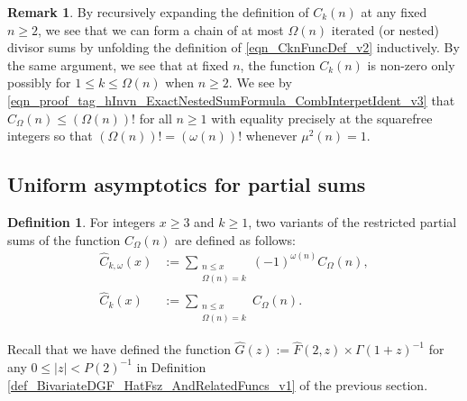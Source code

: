 \documentclass[11pt,reqno,a4letter]{article}
\newcommand{\hlocalref}[1]{\hyperref[#1]{\ref{#1}}}
\numberwithin{equation}{section}
\numberwithin{figure}{section}
\numberwithin{table}{section}
\theoremstyle{plain}
\numberwithin{theorem}{section}
\theoremstyle{definition}
\newtheorem{remark}[theorem]{Remark}
\newtheorem{definition}[theorem]{Definition}
\begin{document}
\begin{remark}
By recursively expanding the definition of $C_k(n)$ 
at any fixed $n \geq 2$, we see that 
we can form a chain of at most $\Omega(n)$ iterated (or nested) divisor sums by 
unfolding the definition of \eqref{eqn_CknFuncDef_v2} inductively. 
By the same argument, we see that at fixed $n$, the function 
$C_k(n)$ is non-zero only possibly for 
$1 \leq k \leq \Omega(n)$ when $n \geq 2$. 
We see by 
\eqref{eqn_proof_tag_hInvn_ExactNestedSumFormula_CombInterpetIdent_v3} 
that $C_{\Omega}(n) \leq (\Omega(n))!$ for all $n \geq 1$ with 
equality precisely at the squarefree integers so that 
$(\Omega(n))! = (\omega(n))!$ whenever $\mu^2(n) = 1$. 
\end{remark}

\subsection{Uniform asymptotics for partial sums}
\label{subSection_Section4_AnalyticPrerequisiteProofsOfUniformBoundsOnCertainPartialSumTypes_v1} 

\begin{definition}
For integers $x \geq 3$ and $k \geq 1$, two variants of the 
restricted partial sums of the function $C_{\Omega}(n)$ are defined as follows: 
\begin{align*} 
\widehat{C}_{k,\omega}(x) & := \sum_{\substack{n \leq x \\ \Omega(n) = k}} 
     (-1)^{\omega(n)} C_{\Omega}(n), \\ 
\widehat{C}_k(x) & := \sum_{\substack{n \leq x \\ \Omega(n) = k}} C_{\Omega}(n). 
\end{align*}
\end{definition}

Recall that we have defined the function 
$\widehat{G}(z) := \widehat{F}(2, z) \times \Gamma(1+z)^{-1}$ for any $0 \leq |z| < P(2)^{-1}$ in 
Definition \hlocalref{def_BivariateDGF_HatFsz_AndRelatedFuncs_v1} 
of the previous section. 
\end{document}
